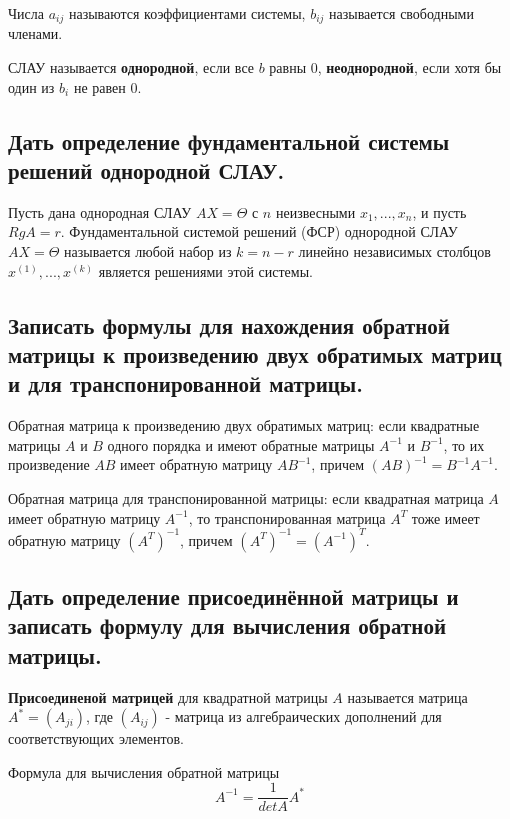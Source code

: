 Числа $a_{ij}$ называются коэффициентами системы,
$b_{ij}$ называется свободными членами.

СЛАУ называется {\bf{однородной}}, если все $b$ равны $0$, {\bf{неоднородной}}, если хотя бы один из $b_i$ не равен $0$.

\subsection{Дать определение фундаментальной системы решений однородной СЛАУ.}

Пусть дана однородная СЛАУ $AX = \Theta$ с $n$ неизвесными $x_1, ..., x_n$, и пусть $RgA = r$. Фундаментальной системой решений (ФСР) однородной СЛАУ $AX = \Theta$ называется любой набор из $k = n - r$ линейно независимых столбцов $x^{(1)}, ..., x^{(k)}$ является решениями этой системы.

\subsection{Записать формулы для нахождения обратной матрицы к произведению двух обратимых матриц и для транспонированной матрицы.}

Обратная матрица к произведению двух обратимых матриц: если квадратные матрицы $A$ и $B$ одного порядка и имеют обратные матрицы $A^{-1}$ и $B^{-1}$, то их произведение $AB$ имеет обратную матрицу $AB^{-1}$, причем $(AB)^{-1} = B^{-1}A^{-1}$.

\vspace*{15pt}

Обратная матрица для транспонированной матрицы: если квадратная матрица $A$ имеет обратную матрицу $A^{-1}$, то транспонированная матрица $A^T$ тоже имеет обратную матрицу $(A^T)^{-1}$, причем $(A^T)^{-1} = (A^{-1})^T$.

\subsection{Дать определение присоединённой матрицы и записать формулу для вычисления обратной матрицы.}

{\bf{Присоединеной матрицей}} для квадратной матрицы $A$ называется матрица $A^* = (A_{ji})$, где $(A_{ij})$ - матрица из алгебраических дополнений для соответствующих элементов.

Формула для вычисления обратной матрицы
$$A^{-1} = \frac{1}{detA}A^*$$

\vspace*{15pt}
\vspace*{15pt}

